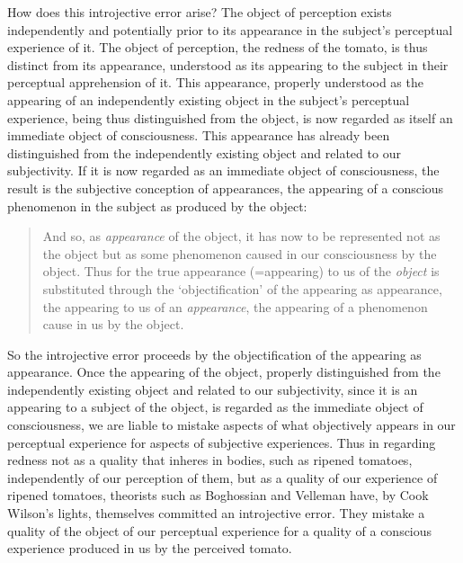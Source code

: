 \documentclass[12pt]{article}
\begin{document}
How does this introjective error arise? The object of perception exists independently and potentially prior to its appearance in the subject's perceptual experience of it. The object of perception, the redness of the tomato, is thus distinct from its appearance, understood as its appearing to the subject in their perceptual apprehension of it. This appearance, properly understood as the appearing of an independently existing object in the subject's perceptual experience, being thus distinguished from the object, is now regarded as itself an immediate object of consciousness. This appearance has already been distinguished from the independently existing object and related to our subjectivity. If it is now regarded as an immediate object of consciousness, the result is the subjective conception of appearances, the appearing of a conscious phenomenon in the subject as produced by the object:
\begin{quote}
    And so, as \emph{appearance} of the object, it has now to be represented not as the object but as some phenomenon caused in our consciousness by the object. Thus for the true appearance (=appearing) to us of the \emph{object} is substituted through the `objectification' of the appearing as appearance, the appearing to us of an \emph{appearance}, the appearing of a phenomenon cause in us by the object. \citep[796]{Cook-Wilson:1926sf}
\end{quote}
So the introjective error proceeds by the objectification of the appearing as appearance. Once the appearing of the object, properly distinguished from the independently existing object and related to our subjectivity, since it is an appearing to a subject of the object, is regarded as the immediate object of consciousness, we are liable to mistake aspects of what objectively appears in our perceptual experience for aspects of subjective experiences. Thus in regarding redness not as a quality that inheres in bodies, such as ripened tomatoes, independently of our perception of them, but as a quality of our experience of ripened tomatoes, theorists such as Boghossian and Velleman have, by Cook Wilson's lights, themselves committed an introjective error. They mistake a quality of the object of our perceptual experience for a quality of a conscious experience produced in us by the perceived tomato.
\end{document}
